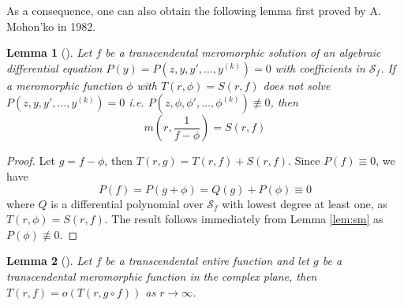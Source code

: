 \documentclass[reqno,12pt]{amsart}
\newtheorem{lem}{Lemma}
\begin{document}
As a consequence, one can also obtain the following lemma first proved by A. Mohon'ko in 1982. 
\begin{lem}[\cite{Mohon82}]\label{thm:C} Let $f$ be a transcendental meromorphic solution of an algebraic differential equation $P(y)=P(z, y, y', \dots, y^{(k)})=0$ with coefficients in $\mathcal{S}_f$. If a meromorphic function $\phi$ with $T(r, \phi)=S(r, f)$ does not solve $P(z, y, y', \dots, y^{(k)})=0$ i.e. $P(z, \phi, \phi', \dots, \phi^{(k)})\not\equiv 0$, then $$m\left(r, \frac{1}{f-\phi}\right)=S(r, f)$$
\end{lem}
\begin{proof} Let $g=f-\phi$, then $T(r, g)=T(r, f)+S(r, f)$. Since $P(f)\equiv 0$, we have $$P(f)=P(g+\phi)=Q(g)+P(\phi)\equiv 0$$ where $Q$ is a differential polynomial over $\mathcal{S}_f$ with lowest degree at least one, as $T(r, \phi)=S(r, f)$. The result follows immediately from Lemma \ref{lem:sm} as $P(\phi)\not\equiv 0$.
\end{proof}
\begin{lem}[\cite{Clunie70}]\label{lem:Cl}
Let $f$ be a transcendental entire function and let $g$ be a transcendental meromorphic function in the complex plane, then $T(r, f)=o(T(r, g\circ f))$ as $r\rightarrow\infty$.
\end{lem}
\end{document}
